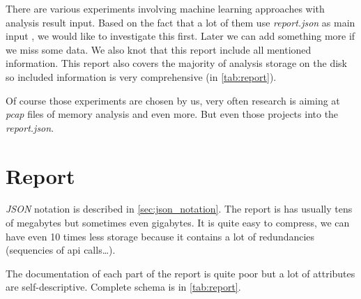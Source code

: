 There are various experiments involving machine learning approaches with analysis result input. Based on the fact that a lot of them use \emph{report.json} as main input \cite{Darshan2016, Dinh2019a, Kim2020, Sethi2019}, we would like to investigate this first. Later we can add something more if we miss some data. We also knot that this report include all mentioned information. This report also covers the majority of analysis storage on the disk so included information is very comprehensive (in \ref{tab:report}).

Of course those experiments are chosen by us, very often research is aiming at \emph{pcap} files of memory analysis and even more. But even those projects into the \emph{report.json}.


\section{Report}
\emph{JSON} notation is described in \ref{sec:json_notation}. The report is has usually tens of megabytes but sometimes even gigabytes. It is quite easy to compress, we can have even 10 times less storage because it contains a lot of redundancies (sequencies of api calls\dots). 

The documentation of each part of the report is quite poor but a lot of attributes are self-descriptive. Complete schema is in \ref{tab:report}.

